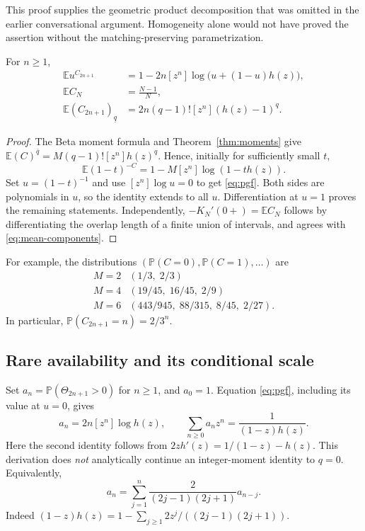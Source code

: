 \documentclass[11pt,letterpaper]{article}
\newcommand{\PP}{\mathbb P}\newcommand{\EE}{\mathbb E}
\newcommand{\rf}[2]{(#1)^{\overline{#2}}}
\newcommand{\ff}[2]{(#1)_{\underline{#2}}}
\begin{document}
This proof supplies the geometric product decomposition that was omitted
in the earlier conversational argument. Homogeneity alone would not have
proved the assertion without the matching-preserving parametrization.

\begin{corollary}\label{cor:pgf}
For $n\ge1$,
\begin{align}
 \EE u^{C_{2n+1}}
 &=1-2n[z^n]\log\bigl(u+(1-u)h(z)\bigr),\label{eq:pgf}\\
 \EE C_N&=\frac{N-1}{N},\label{eq:mean-components}\\
 \EE\ff{C_{2n+1}}q
 &=2n(q-1)![z^n](h(z)-1)^q.\label{eq:falling}
\end{align}
\end{corollary}
\begin{proof}
The Beta moment formula and Theorem~\ref{thm:moments} give
$\EE\rf{C}q=M(q-1)![z^n]h(z)^q$. Hence, initially for sufficiently small
$t$,
\[
 \EE(1-t)^{-C}=1-M[z^n]\log(1-th(z)).
\]
Set $u=(1-t)^{-1}$ and use $[z^n]\log u=0$ to get \eqref{eq:pgf}.
Both sides are polynomials in $u$, so the identity extends to all $u$.
Differentiation at $u=1$ proves the remaining statements. Independently,
$-K_N'(0+)=\EE C_N$ follows by differentiating the overlap length of a finite
union of intervals, and agrees with \eqref{eq:mean-components}.
\end{proof}

For example, the distributions $(\PP(C=0),\PP(C=1),\ldots)$ are
\[
 \begin{array}{c|l}
 M=2 &(1/3,\;2/3)\\
 M=4 &(19/45,\;16/45,\;2/9)\\
 M=6 &(443/945,\;88/315,\;8/45,\;2/27).
 \end{array}
\]
In particular, $\PP(C_{2n+1}=n)=2/3^n$.

\subsection{Rare availability and its conditional scale}

Set $a_n=\PP(\Theta_{2n+1}>0)$ for $n\ge1$, and $a_0=1$. Equation
\eqref{eq:pgf}, including its value at $u=0$, gives
\begin{equation}\label{eq:a-generating}
 a_n=2n[z^n]\log h(z),\qquad
 \sum_{n\ge0}a_nz^n=\frac{1}{(1-z)h(z)}.
\end{equation}
Here the second identity follows from
$2zh'(z)=1/(1-z)-h(z)$. This derivation does \emph{not} analytically
continue an integer-moment identity to $q=0$.
Equivalently,
\begin{equation}\label{eq:renewal}
 a_n=\sum_{j=1}^n\frac{2}{(2j-1)(2j+1)}a_{n-j}.
\end{equation}
Indeed $(1-z)h(z)=1-\sum_{j\ge1}2z^j/((2j-1)(2j+1))$.
\end{document}
